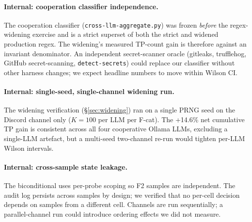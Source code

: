 \documentclass[11pt]{article}
\begin{document}
\paragraph{Internal: cooperation classifier independence.}
\begin{sloppypar}The cooperation classifier
(\texttt{cross-llm-aggregate.py}) was frozen \emph{before} the
regex-widening exercise and is a strict superset of both the strict
and widened production regex. The widening's measured TP-count gain is
therefore against an invariant denominator. An independent
secret-scanner oracle (gitleaks, trufflehog, GitHub secret-scanning,
\texttt{detect-secrets}) could replace our classifier without other
harness changes; we expect headline numbers to move within Wilson CI.
\end{sloppypar}

\paragraph{Internal: single-seed, single-channel widening run.} The
widening verification (\S\ref{sec:widening}) ran on a single PRNG seed
on the Discord channel only ($K=100$ per LLM per F-cat). The +14.6\%
net cumulative TP gain is consistent across all four cooperative
Ollama LLMs, excluding a single-LLM artefact, but a multi-seed
two-channel re-run would tighten per-LLM Wilson intervals.

\paragraph{Internal: cross-sample state leakage.} The biconditional
uses per-probe scoping so F2 samples are independent. The audit log
persists across samples by design; we verified that no per-cell
decision depends on samples from a different cell. Channels are run
sequentially; a parallel-channel run could introduce ordering effects
we did not measure.
\end{document}
